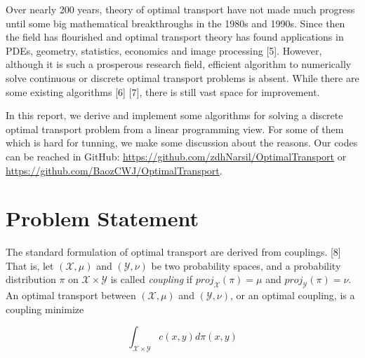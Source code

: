\documentclass{article}
\begin{document}
\begin{large}
Over nearly 200 years, theory of optimal transport have not made much progress until some big mathematical breakthroughs in the 1980s and 1990s. Since then the field has flourished and optimal transport theory has found applications in PDEs, geometry, statistics, economics and image processing [5]. However, although it is such a prosperous research field, efficient algorithm to numerically solve continuous or discrete optimal transport problems is absent. While there are some existing algorithms [6] [7], there is still vast space for improvement.

In this report, we derive and implement some algorithms for solving a discrete optimal transport problem from a linear programming view. For some of them which is hard for tunning, we make some discussion about the reasons. Our codes can be reached in GitHub: \href{https://github.com/zdhNarsil/OptimalTransport}{https://github.com/zdhNarsil/OptimalTransport} or \href{https://github.com/BaozCWJ/OptimalTransport}{https://github.com/BaozCWJ/OptimalTransport}. 

\section{Problem Statement}
The standard formulation of optimal transport are derived from couplings. [8] That is, let $ \left(\mathcal{X}, \mu \right)$ and $\left(\mathcal{Y}, \nu \right)$  be two probability spaces, and a probability distribution $\pi$ on $ \mathcal{X} \times \mathcal{Y} $ is called \emph{coupling} if $ proj_{\mathcal{X}} (\pi) = \mu $ and $ proj_{\mathcal{Y}} (\pi)= \nu $. An optimal transport between $ \left(\mathcal{X}, \mu \right)  $ and $ \left(\mathcal{Y}, \nu \right) $, or an optimal coupling, is a coupling minimize

\begin{equation}
\int_{ \mathcal{X} \times \mathcal{Y} } c ( x, y)  d \pi ( x, y ) 
\label{def}
\end{equation}


\end{large}
\end{document}
